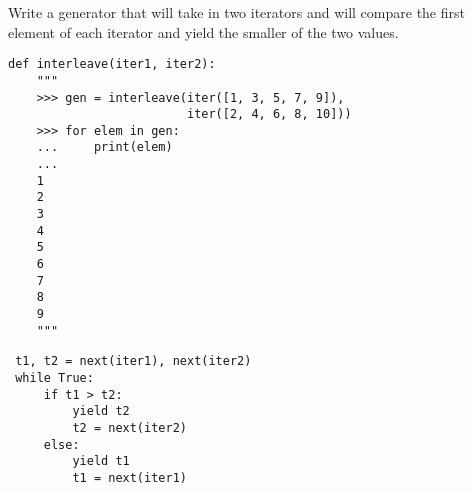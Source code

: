 \question Write a generator that will take in two iterators and will compare the
first element of each iterator and yield the smaller of the two values.

\begin{lstlisting}
def interleave(iter1, iter2):
    """
    >>> gen = interleave(iter([1, 3, 5, 7, 9]),
                         iter([2, 4, 6, 8, 10]))
    >>> for elem in gen:
    ...     print(elem)
    ...
    1
    2
    3
    4
    5
    6
    7
    8
    9
    """
\end{lstlisting}
\begin{solution}[1in]
\begin{lstlisting}
 t1, t2 = next(iter1), next(iter2)
 while True:
     if t1 > t2:
         yield t2
         t2 = next(iter2)
     else:
         yield t1
         t1 = next(iter1)
\end{lstlisting}
\end{solution}
